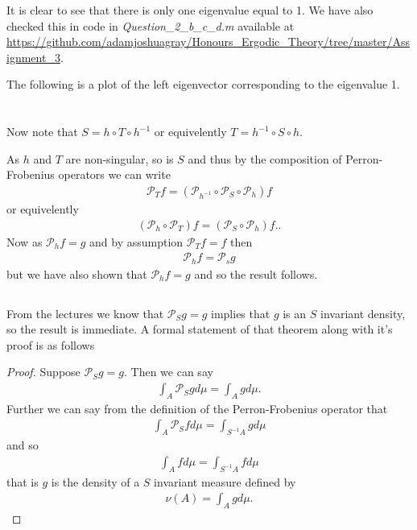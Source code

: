 \documentclass{unswmaths}
\begin{document}
It is clear to see that there is only one eigenvalue equal to 1. We have also checked this in code in \emph{Question\_2\_b\_c\_d.m} available at \url{https://github.com/adamjoshuagray/Honours_Ergodic_Theory/tree/master/Assignment_3}.

The following is a plot of the left eigenvector corresponding to the eigenvalue 1.

\section{}
\subsection{}

Now note that $ S = h \circ T \circ h^{-1} $ or equivelently $ T = h^{-1} \circ S \circ h $.

As $ h $ and $ T $ are non-singular, so is $ S $ and thus by the composition of Perron-Frobenius operators
we can write
\begin{align}
    \mathcal{P}_T f = \left( \mathcal{P}_{h^{-1}} \circ \mathcal{P}_{S} \circ \mathcal{P}_{h} \right) f
\end{align}
or equivelently
\begin{align}
    \left( \mathcal{P}_{h} \circ \mathcal{P}_T \right) f = \left( \mathcal{P}_{S} \circ \mathcal{P}_{h} \right) f..
\end{align}
Now as $ \mathcal{P}_h f = g $ and by assumption $ \mathcal{P}_T f = f $ then
\begin{align}
    \mathcal{P}_h f = \mathcal{P}_s g
\end{align}
but we have also shown that $ \mathcal{P}_h f = g $
and so the result follows.
\subsection{}
From the lectures we know that $ \mathcal{P}_S g = g $ implies that $ g $ is an $ S $ invariant density, so the result is immediate.
A formal statement of that theorem along with it's proof is as follows
\begin{theorem}
\end{theorem}
\begin{proof}
  Suppose $ \mathcal{P}_{S} g = g $. Then we can say
  \begin{align}
    \int_A \mathcal{P}_S g d\mu = \int_A g d\mu.
  \end{align}
  Further we can say from the definition of the Perron-Frobenius operator that
  \begin{align}
    \int_A \mathcal{P}_{S} f d\mu = \int_{S^{-1}A} g d\mu
  \end{align}
  and so
  \begin{align}
    \int_A f d\mu = \int_{S^{-1}A} f d\mu
  \end{align}
  that is $ g $ is the density of a $ S $ invariant measure defined by
  \begin{align}
    \nu(A) = \int_{A} g d\mu.
  \end{align}
\end{proof}
\end{document}
